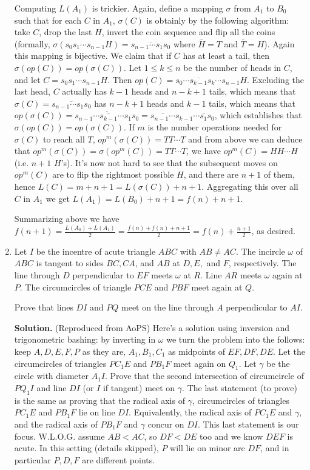 \documentclass[11pt,a4paper]{article}
\newcommand{\ol}{\overline}
\newcommand{\<}{\langle}
\renewcommand{\>}{\rangle}
\begin{document}
\begin{enumerate}
	Computing $L(A_1)$ is trickier. Again, define a mapping $\sigma$ from $A_1$ to $B_0$ such that for each $C$ in $A_1$, $\sigma(C)$ is obtainly by the following algorithm: take $C$, drop the last $H$, invert the coin sequence and flip all the coins (formally, $\sigma(s_0s_1\cdots s_{n-1}H)=\ol{s_{n-1}\cdots s_1s_0}$ where $\ol{H}=T$ and $\ol{T}=H$). 
	Again this mapping is bijective. 
	We claim that if $C$ has at least a tail, then $\sigma(op(C))=op(\sigma(C))$. 
	Let $1\le k\le n$ be the number of heads in $C$, and let $C=s_0s_1\cdots s_{n-1}H$. 
	Then $op(C)=s_0\cdots \ol{s_{k-1}}s_k\cdots s_{n-1}H$. 
	Excluding the last head, $C$ actually has $k-1$ heads and $n-k+1$ tails, which means that $\sigma(C)=\ol{s_{n-1}\cdots s_1s_0}$ has $n-k+1$ heads and $k-1$ tails, which means that $op(\sigma(C))=\ol{s_{n-1}\cdots\ol{s_{k-1}}\cdots s_1s_0}=\ol{s_{n-1}\cdots}s_{k-1}\ol{\cdots s_1s_0}$, which establishes that $\sigma(op(C))=op(\sigma(C))$. 
	If $m$ is the number operations needed for $\sigma(C)$ to reach all $T$, $op^{m}(\sigma(C))=TT\cdots T$ and from above we can deduce that $op^{m}(\sigma(C))=\sigma(op^{m}(C))=TT\cdots T$, we have $op^{m}(C)=HH\cdots H$ (i.e. $n+1$ $H$'s). 
	It's now not hard to see that the subsequent moves on $op^{m}(C)$ are to flip the rightmost possible $H$, and there are $n+1$ of them, hence $L(C)=m+n+1=L(\sigma(C))+n+1$. 
	Aggregating this over all $C$ in $A_1$ we get $L(A_1)=L(B_0)+n+1=f(n)+n+1$. 
	
	Summarizing above we have $f(n+1)=\frac{L(A_0)+L(A_1)}{2}=\frac{f(n)+f(n)+n+1}{2}=f(n)+\frac{n+1}{2}$, as desired. 
	
	\item Let $I$ be the incentre of acute triangle $ABC$ with $AB\neq AC$. The incircle $\omega$ of $ABC$ is tangent to sides $BC, CA$, and $AB$ at $D, E,$ and $F$, respectively. The line through $D$ perpendicular to $EF$ meets $\omega$ at $R$. Line $AR$ meets $\omega$ again at $P$. The circumcircles of triangle $PCE$ and $PBF$ meet again at $Q$.
	
	Prove that lines $DI$ and $PQ$ meet on the line through $A$ perpendicular to $AI$.
	
	\textbf{Solution.} (Reproduced from AoPS) Here's a solution using inversion and trigonometric bashing: by inverting in $\omega$ we turn the problem into the follows: keep $A, D, E, F, P$ as they are, $A_1, B_1, C_1$ as midpoints of $EF, DF, DE$. Let the circumcircles of triangles $PC_1E$ and $PB_1F$ meet again on $Q_1$. Let $\gamma$ be the circle with diameter $A_1I$. Prove that the second intersection of circumcircle of $PQ_1I$ and line $DI$ (or $I$ if tangent) meet on $\gamma$. The last statement (to prove) is the same as proving that the radical axis of $\gamma$, circumcircles of triangles $PC_1E$ and $PB_1F$ lie on line $DI$. Equivalently, the radical axis of $PC_1E$ and $\gamma$, and the radical axis of $PB_1F$ and $\gamma$ concur on $DI$. This last statement is our focus. W.L.O.G. assume $AB<AC$, so $DF<DE$ too and we know $DEF$ is acute. In this setting (details skipped), $P$ will lie on minor arc $DF$, and in particular $P, D, F$ are different points.
	

\end{enumerate}
\end{document}
